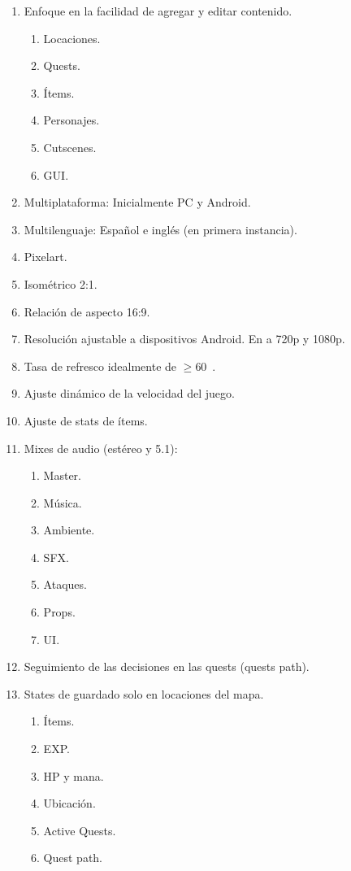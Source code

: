 \begin{enumerate}%
	\item Enfoque en la facilidad de agregar y editar contenido.
	\begin{enumerate}[noitemsep]
		\item Locaciones.
		\item Quests.
		\item Ítems.
		\item Personajes.
		\item Cutscenes.
		\item GUI.
	\end{enumerate}
	\item Multiplataforma: Inicialmente PC y Android.
	\item Multilenguaje: Español e inglés (en primera instancia).
	\item Pixelart.
	\item Isométrico 2:1.
	\item Relación de aspecto 16:9.
	\item Resolución ajustable a dispositivos Android. En  a 720p y 1080p.
	\item Tasa de refresco idealmente de $\geq60$~.
	\item Ajuste dinámico de la velocidad del juego.
	\item Ajuste de stats de ítems.
	\item Mixes de audio (estéreo y 5.1):
	\begin{enumerate}[noitemsep]
		\item Master.
		\item Música.
		\item Ambiente.
		\item SFX.
		\item Ataques.
		\item Props.
		\item UI.
	\end{enumerate}
	\item Seguimiento de las decisiones en las quests (quests path).
	\item States de guardado solo en locaciones del mapa.
	\begin{enumerate}[noitemsep]
		\item Ítems.
		\item EXP.
		\item HP y mana.
		\item Ubicación.
		\item Active Quests.
		\item Quest path.

\end{enumerate}
\end{enumerate}
